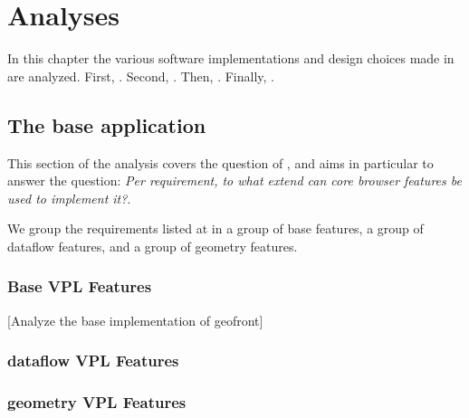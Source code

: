 \chapter{Analyses}%
\label{chap:analyses}

In this chapter the various software implementations and design choices made in  are analyzed. 
First, .
Second, .
Then, .
Finally, .

\section{The base application}
\label{sec:analyses:representation}

This section of the analysis covers the question of \mySubRQOneTitle, and aims in particular to answer the question: \emph{Per requirement, to what extend can core browser features be used to implement it?}.

We group the requirements listed at  in a group of base features, a group of dataflow features, and a group of geometry features.

\subsection{Base VPL Features}

[Analyze the base implementation of geofront]


\subsection{dataflow VPL Features}



\subsection{geometry VPL Features}



